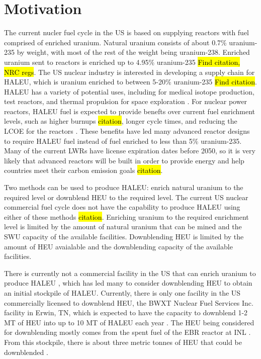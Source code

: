 \section{Motivation}
The current nucler fuel cycle in the US is based on supplying reactors 
with fuel comprised of enriched uranium. Natural uranium consists of 
about 0.7\% uranium-235 by weight, with most of the rest of the weight being 
uranium-238. Enriched uranium sent to reactors is enriched up to 4.95\% 
uranium-235 \hl{Find citation, NRC regs}. The US nuclear industry is 
interested in developing a supply chain for \gls{HALEU}, which is 
uranium enriched to between 5-20\% uranium-235 \hl{Find citation}. \gls{HALEU}
has a variety of potential uses, including for medical isotope production,
test reactors, and thermal propulsion for space exploration \cite{nagley_ha-leu_2020}.
For nuclear power reactors, \gls{HALEU} fuel is expected to provide benefts 
over current fuel enrichment levels, such as higher burnups \hl{citation},
longer cycle times, and 
reducing the \gls{LCOE} for the reactors \cite{carlson_economic_2020}. These 
benefits have led many advanced reactor designs to require 
\gls{HALEU} fuel instead of fuel enriched to less than 5\% uranium-235. 
Many of the current \glspl{LWR} have license expiration dates before 2050, 
so it is very likely that advanced reactors will be built in order to 
provide energy and help countries meet their carbon emission goals \hl{citation}.

Two methods can be used to produce \gls{HALEU}: enrich natural uranium to the 
required level or downblend \gls{HEU} to the required level. The current US
nuclear commercial fuel cycle does not have the capability to produce 
\gls{HALEU} using either of these methods \hl{citation}. Enriching uranium 
to the required enrichment level is limited by the amount of natural uranium 
that can be mined and the \gls{SWU} capacity of the available facilities. 
Downblending \gls{HEU} is limited by the amount of \gls{HEU} avaialable and 
the downblending capacity of the available facilities. 

There is currently not a commercial facility in the US that can enrich 
uranium to produce \gls{HALEU} \cite{hussain_nei_2018}, which has led 
many to consider downblending \gls{HEU} to obtain an initial stockpile of 
\gls{HALEU}. 
Currently, there is only one facility in the US commercially licensed to 
downblend \gls{HEU}, the BWXT Nuclear Fuel Services Inc. facility in 
Erwin, TN, which is expected to have the capacity to downblend 1-2 
MT of \gls{HEU} into up to 10 MT of \gls{HALEU} each year \cite{nagley_ha-leu_2020}.
The \gls{HEU} being considered for downblending mostly comes from the spent 
fuel of the \gls{EBR} reactor at \gls{INL} \cite{patterson_haleu_2019}. From 
this stockpile, there is about three metric tonnes of \gls{HEU} that 
could be downblended \cite{patterson_haleu_2019}.



